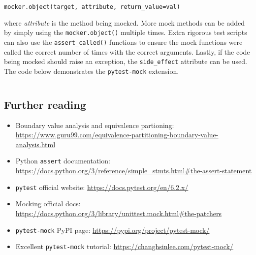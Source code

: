 \documentclass[11pt]{article}
\begin{document}
\vspace{\baselineskip}
\noindent
\texttt{mocker.object(target, attribute, return_value=val)}
\vspace{\baselineskip}

\noindent
where \textit{attribute} is the method being mocked. More mock methods can be added by simply using the \texttt{mocker.object()} multiple times. Extra rigorous test scripts can also use the \texttt{assert_called()} functions to ensure the mock functions were called the correct number of times with the correct arguments. Lastly, if the code being mocked should raise an exception, the \texttt{side_effect} attribute can be used. The code below demonstrates the \texttt{pytest-mock} extension.

\inputminted[]{python}{python_examples/pytest-mock_example.py}

\subsection{Further reading}

\begin{itemize}
    \item Boundary value analysis and equivalence partioning: \url{https://www.guru99.com/equivalence-partitioning-boundary-value-analysis.html}
    \item Python \texttt{assert} documentation: \url{https://docs.python.org/3/reference/simple_stmts.html#the-assert-statement}
    \item \texttt{pytest} official website: \url{https://docs.pytest.org/en/6.2.x/}
    \item Mocking official docs: \url{https://docs.python.org/3/library/unittest.mock.html#the-patchers}
    \item \texttt{pytest-mock} PyPI page: \url{https://pypi.org/project/pytest-mock/}
    \item Excellent \texttt{pytest-mock} tutorial: \url{https://changhsinlee.com/pytest-mock/}
\end{itemize}

\newpage

\printbibliography
\end{document}
